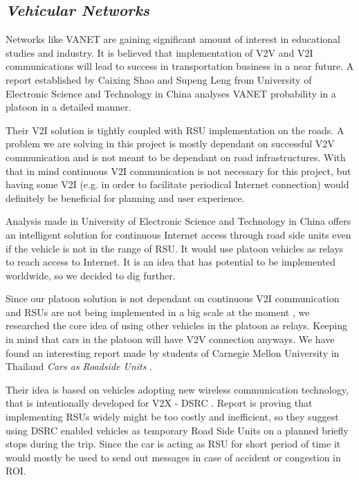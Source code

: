 \subsection{\textit{Vehicular Networks}}

% 
Networks like \acrfull{VANET} are gaining significant amount of interest in educational studies and industry. It is believed that implementation of V2V and V2I communications will lead to success in transportation business in a near future. A report established by Caixing Shao and Supeng Leng from University of Electronic Science and Technology in China \cite{Shao2014AnalysisNetworks} analyses \acrshort{VANET} probability in a platoon in a detailed manner.\par
% 
Their \acrshort{V2I} solution is tightly coupled with \acrshort{RSU} implementation on the roads. A problem we are solving in this project is mostly dependant on successful \acrshort{V2V} communication and is not meant to be dependant on road infrastructures. With that in mind continuous V2I communication is not necessary for this project, but having some \acrshort{V2I} (e.g. in order to facilitate periodical Internet connection) would definitely be beneficial for planning and user experience.\par
% 
Analysis made in University of Electronic Science and Technology in China offers an intelligent solution for continuous Internet access through road side units even if the vehicle is not in the range of \acrshort{RSU}. It would use platoon vehicles as relays to reach access to Internet. It is an idea that has potential to be implemented worldwide, so we decided to dig further.\par
% 
Since our platoon solution is not dependant on continuous V2I communication and \acrshort{RSU}s are not being implemented in a big scale at the moment \cite{Tonguz2013CarsSolution}, we researched the core idea of using other vehicles in the platoon as relays. Keeping in mind that cars in the platoon will have V2V connection anyways. We have found an interesting report made by students of Carnegie Mellon University in Thailand \emph{Cars as Roadside Units} \cite{Tonguz2013CarsSolution}.\par
% 
Their idea is based on vehicles adopting new wireless communication technology, that is intentionally developed for \acrfull{V2X} - \acrfull{DSRC} \cite{OfficeoftheAssistantSecretaryforResearchandTechnologyIntelligentSheet}.
Report is proving that implementing RSUs widely might be too costly and inefficient, so they suggest using DSRC enabled vehicles as temporary Road Side Units on a planned briefly stops during the trip. Since the car is acting as RSU for short period of time it would mostly be used to send out messages in case of accident or congestion in \acrfull{ROI}.